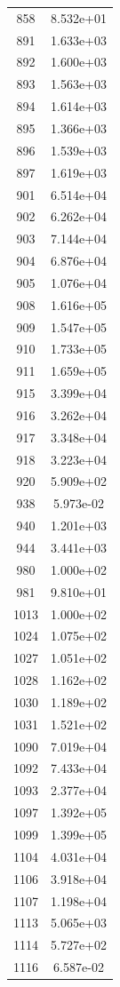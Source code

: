 \documentclass[12pt]{article}
\begin{document}
\begin{longtable}{@{}cc@{}}
858 & 8.532e+01 \\
891 & 1.633e+03 \\
892 & 1.600e+03 \\
893 & 1.563e+03 \\
894 & 1.614e+03 \\
895 & 1.366e+03 \\
896 & 1.539e+03 \\
897 & 1.619e+03 \\
901 & 6.514e+04 \\
902 & 6.262e+04 \\
903 & 7.144e+04 \\
904 & 6.876e+04 \\
905 & 1.076e+04 \\
908 & 1.616e+05 \\
909 & 1.547e+05 \\
910 & 1.733e+05 \\
911 & 1.659e+05 \\
915 & 3.399e+04 \\
916 & 3.262e+04 \\
917 & 3.348e+04 \\
918 & 3.223e+04 \\
920 & 5.909e+02 \\
938 & 5.973e-02 \\
940 & 1.201e+03 \\
944 & 3.441e+03 \\
980 & 1.000e+02 \\
981 & 9.810e+01 \\
1013 & 1.000e+02 \\
1024 & 1.075e+02 \\
1027 & 1.051e+02 \\
1028 & 1.162e+02 \\
1030 & 1.189e+02 \\
1031 & 1.521e+02 \\
1090 & 7.019e+04 \\
1092 & 7.433e+04 \\
1093 & 2.377e+04 \\
1097 & 1.392e+05 \\
1099 & 1.399e+05 \\
1104 & 4.031e+04 \\
1106 & 3.918e+04 \\
1107 & 1.198e+04 \\
1113 & 5.065e+03 \\
1114 & 5.727e+02 \\
1116 & 6.587e-02 \\

\end{longtable}
\end{document}
